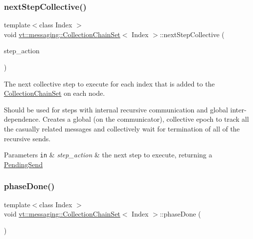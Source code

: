 \subsubsection{\texorpdfstring{next\+Step\+Collective()}{nextStepCollective()}\hspace{0.1cm}{\footnotesize\ttfamily [2/2]}}
{\footnotesize\ttfamily template$<$class Index $>$ \\
void \hyperlink{classvt_1_1messaging_1_1_collection_chain_set}{vt\+::messaging\+::\+Collection\+Chain\+Set}$<$ Index $>$\+::next\+Step\+Collective (\begin{DoxyParamCaption}\item[{std\+::function$<$ \hyperlink{structvt_1_1messaging_1_1_pending_send}{Pending\+Send}(Index)$>$}]{step\+\_\+action }\end{DoxyParamCaption})\hspace{0.3cm}{\ttfamily [inline]}}



The next collective step to execute for each index that is added to the \hyperlink{classvt_1_1messaging_1_1_collection_chain_set}{Collection\+Chain\+Set} on each node. 

Should be used for steps with internal recursive communication and global inter-\/dependence. Creates a global (on the communicator), collective epoch to track all the casually related messages and collectively wait for termination of all of the recursive sends.


\begin{DoxyParams}[1]{Parameters}
\mbox{\tt in}  & {\em step\+\_\+action} & the next step to execute, returning a {\ttfamily \hyperlink{structvt_1_1messaging_1_1_pending_send}{Pending\+Send}} \\
\hline
\end{DoxyParams}
\mbox{\label{classvt_1_1messaging_1_1_collection_chain_set_afcb749b22063068d060f35fdcd2320b3}} 
\subsubsection{\texorpdfstring{phase\+Done()}{phaseDone()}}
{\footnotesize\ttfamily template$<$class Index $>$ \\
void \hyperlink{classvt_1_1messaging_1_1_collection_chain_set}{vt\+::messaging\+::\+Collection\+Chain\+Set}$<$ Index $>$\+::phase\+Done (\begin{DoxyParamCaption}{ }\end{DoxyParamCaption})\hspace{0.3cm}{\ttfamily [inline]}}



